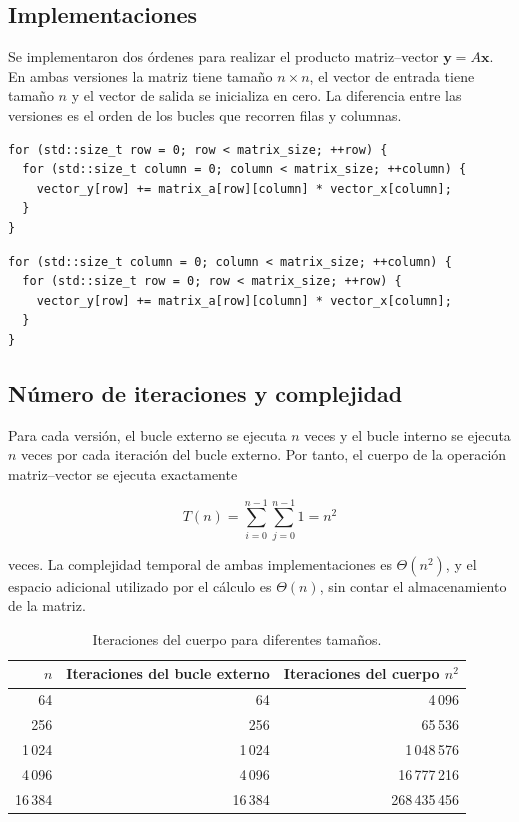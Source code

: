 \documentclass[a4paper,12pt]{article}
\begin{document}
\subsection{Implementaciones}

Se implementaron dos órdenes para realizar el producto matriz--vector
\(\mathbf{y}=A\mathbf{x}\). En ambas versiones la matriz tiene tamaño
\(n\times n\), el vector de entrada tiene tamaño \(n\) y el vector de salida
se inicializa en cero. La diferencia entre las versiones es el orden de los
bucles que recorren filas y columnas.

\begin{lstlisting}[caption={Orden por filas: \texttt{row-major}},label={lst:row-major}]
for (std::size_t row = 0; row < matrix_size; ++row) {
  for (std::size_t column = 0; column < matrix_size; ++column) {
    vector_y[row] += matrix_a[row][column] * vector_x[column];
  }
}
\end{lstlisting}

\begin{lstlisting}[caption={Orden por columnas: \texttt{column-major}},label={lst:column-major}]
for (std::size_t column = 0; column < matrix_size; ++column) {
  for (std::size_t row = 0; row < matrix_size; ++row) {
    vector_y[row] += matrix_a[row][column] * vector_x[column];
  }
}
\end{lstlisting}

\subsection{Número de iteraciones y complejidad}

Para cada versión, el bucle externo se ejecuta \(n\) veces y el bucle interno
se ejecuta \(n\) veces por cada iteración del bucle externo. Por tanto, el
cuerpo de la operación matriz--vector se ejecuta exactamente

\[
T(n)=\sum_{i=0}^{n-1}\sum_{j=0}^{n-1}1=n^2
\]

veces. La complejidad temporal de ambas implementaciones es
\(\Theta(n^2)\), y el espacio adicional utilizado por el cálculo es
\(\Theta(n)\), sin contar el almacenamiento de la matriz.

\begin{table}[H]
    \centering
    \caption{Iteraciones del cuerpo para diferentes tamaños.}
    \label{tab:loop-iterations}
    \begin{tabular}{r r r}
        \toprule
        \(n\) & Iteraciones del bucle externo & Iteraciones del cuerpo \(n^2\) \\
        \midrule
        64   & 64   & 4\,096 \\
        256  & 256  & 65\,536 \\
        1\,024 & 1\,024 & 1\,048\,576 \\
        4\,096 & 4\,096 & 16\,777\,216\\
        16\,384 & 16\,384 & 268\,435\,456\\
        \bottomrule
    \end{tabular}
\end{table}
\end{document}
